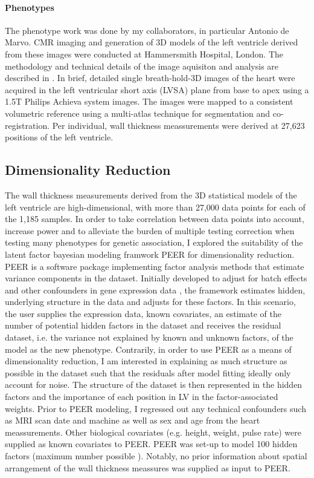 \paragraph{Phenotypes}
The phenotype work was done by my collaborators, in particular Antonio de Marvo. CMR imaging and generation of 3D models of the left ventricle derived from these images were conducted at Hammersmith Hospital, London. The methodology and technical details of the image aquisiton and analysis are described in \citep{DeMarvao2014}. In brief, detailed single breath-hold-3D images of the heart were acquired in the left ventricular short axis (LVSA) plane from base to apex using a 1.5T Philips Achieva system images. The images were mapped to a consistent volumetric reference using a multi-atlas technique for segmentation and co-registration. Per individual, wall thickness meassurements were derived at 27,623 positions of the left ventricle.

\subsection{Dimensionality Reduction}
The wall thickness measurements derived from the 3D statistical models of the left ventricle are high-dimensional, with more than 27,000 data points for each of the 1,185 samples. In order to take correlation between data points into account, increase power and to alleviate the burden of multiple testing correction when testing many phenotypes for genetic association, I explored the suitability of the latent factor bayesian modeling framwork PEER  \citep{Stegle2010,Stegle2012} for dimensionality reduction. PEER is a software package implementing factor analysis methods that estimate variance components in the dataset. Initially developed to adjust for batch effects and other confounders in gene expression data \citep{Stegle2010}, the framework estimates hidden, underlying structure in the data and adjusts for these factors. In this scenario, the user supplies the expression data, known covariates, an estimate of the number of potential hidden factors in the dataset and receives the residual dataset, i.e. the variance not explained by known and unknown factors, of the model as the new phenotype. Contrarily, in order to use PEER as a means of dimensionality reduction, I am interested in explaining as much structure as possible in the dataset such that the residuals after model fitting ideally only account for noise. The structure of the dataset is then represented in the hidden factors and the importance of each position in LV in the factor-associated weights. 
Prior to PEER  modeling, I regressed out any technical confounders such as MRI scan date and machine as well as sex and age from the heart meassurements. Other biological covariates (e.g. height, weight, pulse rate) were supplied as known covariates to PEER. PEER was set-up to model 100 hidden factors (maximum number possible \citep{Stegle2012}).  Notably, no prior information about spatial arrangement of the wall thickness meassures was supplied as input to PEER.

